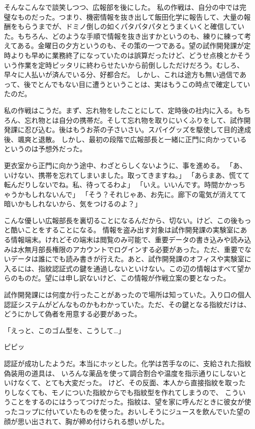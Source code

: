 そんなこんなで談笑しつつ、広報部を後にした。
私の作戦は、自分の中では完璧なものだった。つまり、機密情報を抜き出して飯田化学に報告して、大量の報酬をもらうまでが、ドミノ倒しの如くパタパタパタとうまくいくと確信していた。もちろん、どのような手順で情報を抜き出すかというのも、練りに練って考えてある。金曜日の夕方というのも、その策の一つである。望の試作開発課が定時よりも早めに業務終了になっていたのは誤算だったけど、どうせ点検とかそういう作業を定時ピッタリに終わらせたいから前倒ししただけだろう。むしろ、早々に人払いが済んでいる分、好都合だ。
しかし、これは途方も無い過信であって、後でとんでもない目に遭うということは、実はもうこの時点で確定していたのだ。

私の作戦はこうだ。まず、忘れ物をしたことにして、定時後の社内に入る。もちろん、忘れ物とは自分の携帯だ。そして忘れ物を取りにいくふりをして、試作開発課に忍び込む。後はもうお茶の子さいさい。スパイグッズを駆使して目的達成後、颯爽と退散。
しかし、最初の段階で広報部長と一緒に正門に向かっているというのは予想外だった。

更衣室から正門に向かう途中、わざとらしくないように、事を進める。
「あ、いけない、携帯を忘れてしまいました。取ってきますね。」
「あらまあ、慌てて転んだりしないでね。私、待ってるわよ」
「いえ。いいんです。時間かかっちゃうかもしれないんで」
「そう？それじゃあ、お先に。廊下の電気が消えてて暗いかもしれないから、気をつけるのよ？」

こんな優しい広報部長を裏切ることになるんだから、切ない。けど、この後もっと酷いことをすることになる。
情報を盗み出す対象は試作開発課の実験室にある情報端末。けれどその端末は閲覧のみ可能で、重要データの書き込みや読み込みは水無月部長権限のアカウントでログインする必要があった。ただ、重要でないデータは誰にでも読み書きが行えた。あと、試作開発課のオフィスや実験室に入るには、指紋認証式の鍵を通過しないといけない。この辺の情報はすべて望からのものだ。望には申し訳ないけど、この情報が作戦立案の要となった。

試作開発課には何度か行ったことがあったので場所は知っていた。入り口の個人認証システムがどんなものかもわかっていた。ただ、その鍵となる指紋だけは、どうにかして偽者を用意する必要があった。

「えっと、このゴム型を、こうして…」

ピピッ

認証が成功したようだ。本当にホッとした。化学は苦手なのに、支給された指紋偽装用の道具は、
いろんな薬品を使って調合割合や温度を指示通りにしないといけなくて、とても大変だった。
けど、その反面、本人から直接指紋を取ったりしなくても、モノについた指紋からでも指紋型を作れてしまうので、
こういうことをするのにはうってつけだった。指紋は、望を家に呼んだときに彼女が使ったコップに付いていたものを使った。おいしそうにジュースを飲んでいた望の顔が思い出されて、胸が締め付けられる想いがした。

